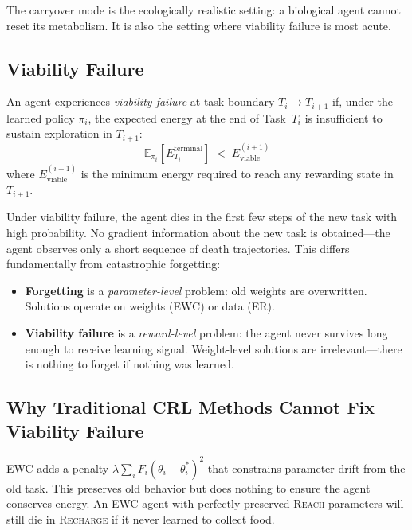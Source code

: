 \documentclass{article}
\newcommand{\energy}{E}
\begin{document}
The carryover mode is the ecologically realistic setting: a biological
agent cannot reset its metabolism. It is also the setting where viability
failure is most acute.

\subsection{Viability Failure}
\label{sec:viability}

\begin{definition}
An agent experiences \emph{viability failure} at task boundary $T_i \to T_{i+1}$
if, under the learned policy $\pi_i$, the expected energy at the end of
Task~$T_i$ is insufficient to sustain exploration in $T_{i+1}$:
\begin{equation}
  \mathbb{E}_{\pi_i}\!\left[\energy_{T_i}^{\text{terminal}}\right]
  \;<\; \energy_{\text{viable}}^{(i+1)}
\end{equation}
where $\energy_{\text{viable}}^{(i+1)}$ is the minimum energy required to
reach any rewarding state in $T_{i+1}$.
\end{definition}

Under viability failure, the agent dies in the first few steps of the new
task with high probability. No gradient information about the new task is
obtained—the agent observes only a short sequence of death trajectories.
This differs fundamentally from catastrophic forgetting:

\begin{itemize}[leftmargin=*,topsep=1pt,itemsep=1pt]
  \item \textbf{Forgetting} is a \emph{parameter-level} problem: old
        weights are overwritten. Solutions operate on weights (EWC) or
        data (ER).
  \item \textbf{Viability failure} is a \emph{reward-level} problem: the
        agent never survives long enough to receive learning signal.
        Weight-level solutions are irrelevant—there is nothing to forget
        if nothing was learned.
\end{itemize}

\subsection{Why Traditional CRL Methods Cannot Fix Viability Failure}

EWC adds a penalty $\lambda \sum_i F_i (\theta_i - \theta_i^*)^2$ that
constrains parameter drift from the old task. This preserves old behavior
but does nothing to ensure the agent conserves energy. An EWC agent with
perfectly preserved \textsc{Reach} parameters will still die in
\textsc{Recharge} if it never learned to collect food.
\end{document}
